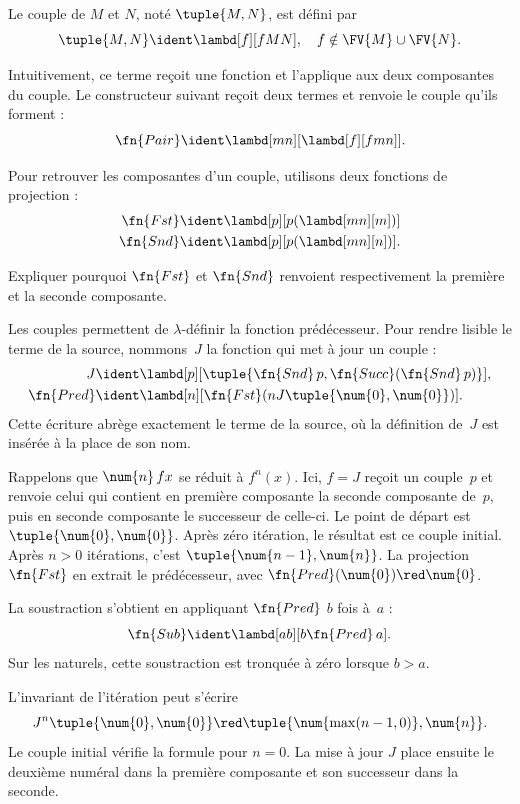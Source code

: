 \documentclass[../../../include/open-logic-section]{subfiles}
\begin{document}

\begin{defn}
Le couple de $M$ et $N$, noté
$\tuple{M,N}$, est défini par
\[
  \tuple{M,N} \ident \lambd[f][fMN],\quad f\notin\FV{M}\cup\FV{N}.
\]
\end{defn}

Intuitivement, ce terme reçoit une fonction
et l'applique aux deux composantes du
couple. Le constructeur suivant reçoit
deux termes et renvoie le couple qu'ils
forment :
\[
  \fn{Pair} \ident \lambd[mn][\lambd[f][fmn]].
\]

Pour retrouver les composantes d'un couple,
utilisons deux fonctions de projection :
\begin{align*}
  \fn{Fst} & \ident
    \lambd[p][p(\lambd[mn][m])]\\
  \fn{Snd} & \ident
    \lambd[p][p(\lambd[mn][n])].
\end{align*}

\begin{prob}
Expliquer pourquoi $\fn{Fst}$ et
$\fn{Snd}$ renvoient respectivement
la première et la seconde composante.
\end{prob}

Les couples permettent de $\lambda$-définir
la fonction prédécesseur. Pour rendre
lisible le terme de la source, nommons~$J$
la fonction qui met à jour un couple :
\begin{align*}
  J & \ident
    \lambd[p][\tuple{\fn{Snd}\,p,
      \fn{Succ}(\fn{Snd}\,p)}],\\
  \fn{Pred} & \ident
    \lambd[n][\fn{Fst}(n J
      \tuple{\num{0},\num{0}})].
\end{align*}
Cette écriture abrège exactement le terme
de la source, où la définition de~$J$
est insérée à la place de son nom.

Rappelons que $\num{n}\,f x$ se réduit
à $f^n(x)$. Ici, $f=J$ reçoit un
couple~$p$ et renvoie celui qui contient
en première composante la seconde
composante de~$p$, puis en seconde
composante le successeur de celle-ci.
Le point de départ est
$\tuple{\num{0},\num{0}}$.
Après zéro itération, le résultat est
ce couple initial. Après $n>0$
itérations, c'est
$\tuple{\num{n-1},\num{n}}$.
La projection $\fn{Fst}$ en extrait
le prédécesseur, avec
$\fn{Pred}(\num{0})\red\num{0}$.

La soustraction s'obtient en appliquant
$\fn{Pred}$ $b$ fois à~$a$ :
\[
  \fn{Sub} \ident
  \lambd[ab][b \fn{Pred}\, a].
\]
Sur les naturels, cette soustraction
est tronquée à zéro lorsque $b>a$.

L'invariant de l'itération peut s'écrire
\[
J^n\tuple{\num{0},\num{0}}
\red \tuple{\num{\max(n-1,0)},\num{n}}.
\]
Le couple initial vérifie la formule pour $n=0$.
La mise à jour $J$ place ensuite le deuxième numéral
dans la première composante et son successeur dans la seconde.
\end{document}
